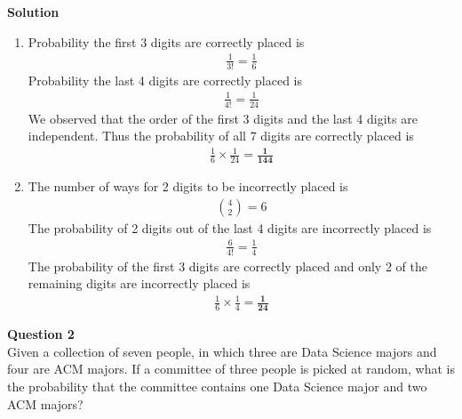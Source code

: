 \documentclass{uofa-eng-assignment}
\begin{document}
\begin{enumerate}
        \textbf{Solution}
        \begin{enumerate}
            \item Probability the first 3 digits are correctly placed is
                  \begin{align*}
                      \frac{1}{3!} = \frac{1}{6}
                  \end{align*}
                  Probability the last 4 digits are correctly placed is
                  \begin{align*}
                      \frac{1}{4!} = \frac{1}{24}
                  \end{align*}
                  We observed that the order of the first 3 digits and the last 4 digits are independent. Thus the probability of all 7 digits are correctly placed is
                  \begin{align*}
                      \frac{1}{6} \times \frac{1}{24} =  \boldsymbol{\frac{1}{144}}
                  \end{align*}
            \item The number of ways for 2 digits to be incorrectly placed is
                  \begin{align*}
                      \binom{4}{2} = 6
                  \end{align*}
                  The probability of 2 digits out of the last 4 digits are incorrectly placed is
                  \begin{align*}
                      \frac{6}{4!} = \frac{1}{4}
                  \end{align*}
                  The probability of the first 3 digits are correctly placed and only 2 of the remaining digits are incorrectly placed is
                  \begin{align*}
                      \frac{1}{6} \times \frac{1}{4} = \boldsymbol{\frac{1}{24}}
                  \end{align*}
        \end{enumerate}
        \textbf{Question 2} \\
        Given a collection of seven people, in which three are Data Science majors and four are ACM
        majors. If a committee of three people is picked at random, what is the probability that the
        committee contains one Data Science major and two ACM majors?


\end{enumerate}
\end{document}
